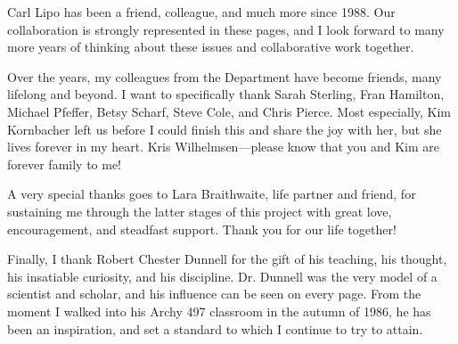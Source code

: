 \vskip 0.3cm

Carl Lipo has been a friend, colleague, and much more since 1988.  Our collaboration is strongly represented in these pages, and I look forward to many more years of thinking about these issues and collaborative work together.  

\vskip 0.3cm

Over the years, my colleagues from the Department have become friends, many lifelong and beyond.  I want to specifically thank Sarah Sterling, Fran Hamilton, Michael Pfeffer, Betsy Scharf, Steve Cole, and Chris Pierce.  Most especially, Kim Kornbacher left us before I could finish this and share the joy with her, but she lives forever in my heart.  Kris Wilhelmsen---please know that you and Kim are forever family to me!

\vskip 0.3cm

A very special thanks goes to Lara Braithwaite, life partner and friend, for sustaining me through the latter stages of this project with great love, encouragement, and steadfast support.  Thank you for our life together! 
\vskip 0.3cm

Finally, I thank Robert Chester Dunnell for the gift of his teaching, his thought, his insatiable curiosity, and his discipline.  Dr. Dunnell was the very model of a scientist and scholar, and his influence can be seen on every page.  From the moment I walked into his Archy 497 classroom in the autumn of 1986, he has been an inspiration, and set a standard to which I continue to try to attain.  






% 



\newpage
%